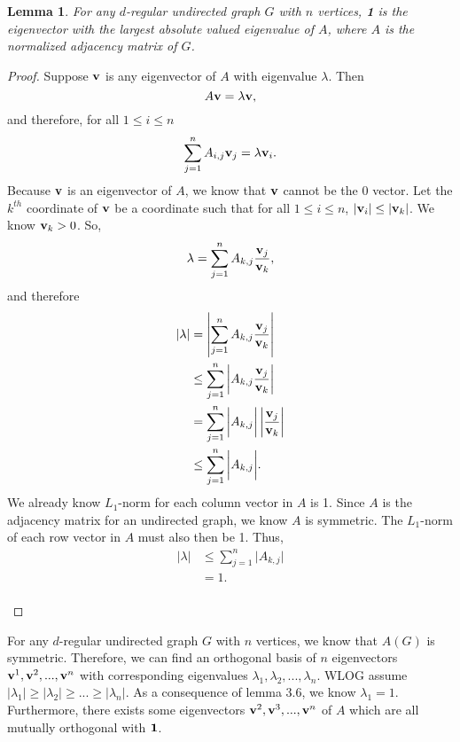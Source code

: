 \documentclass[psamsfonts, 10pt]{amsart}
\newtheorem{lem}[thm]{Lemma}
\theoremstyle{definition}
\theoremstyle{remark}
\numberwithin{equation}{section}
\begin{document}
\begin{lem}
For any $d$-regular undirected graph $G$ with $n$ vertices, {\bf 1} is the eigenvector with the largest absolute valued eigenvalue of $A$, where $A$ is the normalized adjacency matrix of $G$.
\end{lem}
\begin{proof}
Suppose ${\bf v}$ is any eigenvector of  $A$ with eigenvalue $\lambda$. Then
\[
A{\bf v} = \lambda{\bf v},
\]
and therefore, for all $1 \leq i \leq n$
\[
\sum_{j = 1}^nA_{i, j}{\bf v}_j = \lambda{\bf v}_i. 
\]
Because ${\bf v}$ is an eigenvector of $A$, we know that ${\bf v}$ cannot be the 0 vector. Let the $k^{th}$ coordinate of ${\bf v}$ be a coordinate such that for all $1 \leq i \leq n$, $\lvert {\bf v}_i \rvert \leq \lvert {\bf v}_k \rvert$. We know ${\bf v}_k > 0$. So,
\[
\lambda = \sum_{j = 1}^nA_{k, j}\frac{{\bf v}_j}{{\bf v}_k},
\]
and therefore
\[\begin{aligned}
 \lvert \lambda \rvert &= \left| \sum_{j = 1}^nA_{k, j}\frac{{\bf v}_j}{{\bf v}_k} \right|\\
&\leq \sum_{j = 1}^n\left|A_{k, j}\frac{{\bf v}_j}{{\bf v}_k} \right|\\
 &= \sum_{j = 1}^n\bigg\lvert A_{k, j}\bigg\rvert \left| \frac{{\bf v}_j}{{\bf v}_k} \right|\\
 &\leq \sum_{j = 1}^n\bigg\lvert A_{k, j}\bigg\rvert.
\end{aligned}
\]
We already know $L_1$-norm for each column vector in $A$ is 1. Since $A$ is the adjacency matrix for an undirected graph, we know $A$ is symmetric. The $L_1$-norm of each row vector in $A$ must also then be 1. Thus, 
\[
\begin{aligned}
 \lvert \lambda \rvert &\leq \sum_{j = 1}^n\bigg\lvert A_{k, j}\bigg\rvert \\
 &= 1.
\end{aligned}
\]
\\
\end{proof}


For any $d$-regular undirected graph $G$ with $n$ vertices, we know that $A(G)$ is symmetric. Therefore, we can find an orthogonal basis of $n$ eigenvectors ${\bf v}^1, {\bf v}^2, ... ,{\bf v}^n$ with corresponding eigenvalues $\lambda_1, \lambda_2, ... , \lambda_n$. WLOG assume $\lvert \lambda_1 \rvert \geq \lvert \lambda_2 \rvert \geq ... \geq \lvert \lambda_n \rvert$. As a consequence of lemma 3.6, we know $\lambda_1 = 1$. Furthermore, there exists some eigenvectors ${\bf v}^2, {\bf v}^3, ..., {\bf v}^n$ of $A$ which are all mutually orthogonal with ${\bf 1}$.
\end{document}
